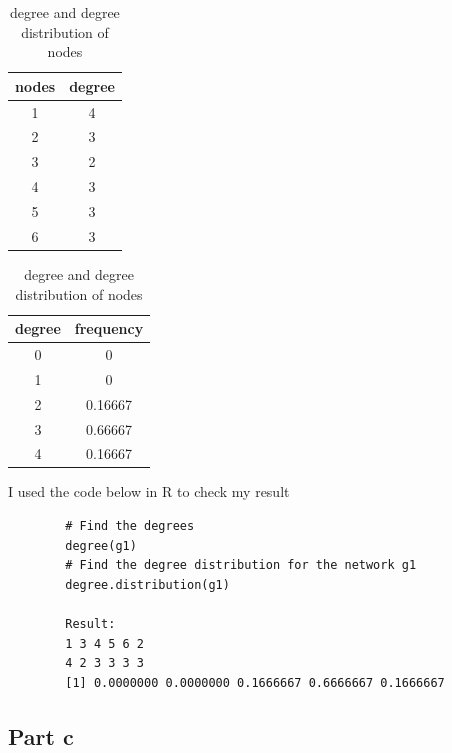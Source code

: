 \begin{answer}
    \begin{table}[H]
    \centering
    \caption{degree and degree distribution of nodes}
    \label{tab:tab1}
        \begin{tabular}{|c|c|}
            \hline
            \textbf{nodes} & \textbf{degree} \\ \hline
            1              & 4               \\ \hline
            2              & 3               \\ \hline
            3              & 2               \\ \hline
            4              & 3               \\ \hline
            5              & 3               \\ \hline
            6              & 3               \\ \hline
        \end{tabular}
        \quad
        \begin{tabular}{|c|c|}
        \hline
        \textbf{degree} & \textbf{frequency} \\ \hline
        0               & 0                  \\ \hline
        1               & 0                  \\ \hline
        2               & 0.16667            \\ \hline
        3               & 0.66667            \\ \hline
        4               & 0.16667            \\ \hline
        \end{tabular}
    \end{table}
    I used the code below in R to check my result
    \begin{verbatim}
        # Find the degrees
        degree(g1)
        # Find the degree distribution for the network g1
        degree.distribution(g1)
        
        Result:
        1 3 4 5 6 2 
        4 2 3 3 3 3 
        [1] 0.0000000 0.0000000 0.1666667 0.6666667 0.1666667
    \end{verbatim}
\end{answer}

\subsection{Part c}

